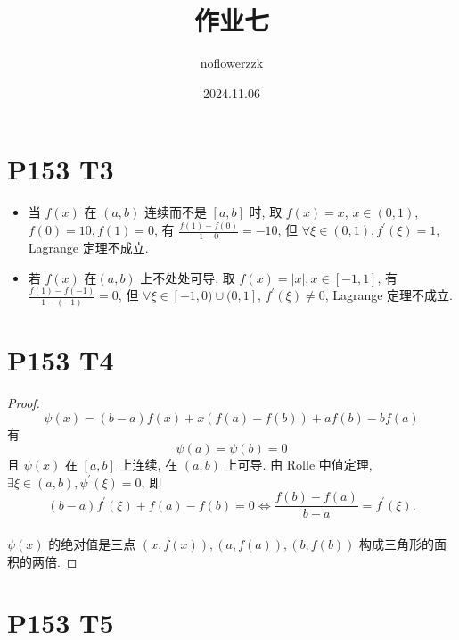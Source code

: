 \documentclass{article}
\title{作业七}
\author{noflowerzzk}
\date{2024.11.06}
\begin{document}
\maketitle

\section*{P153 T3}

\begin{itemize}
    \item 当 $f(x)$ 在 $(a, b)$ 连续而不是 $[a, b]$ 时, 取 $f(x) = x$, $x \in (0, 1)$, $f(0) = 10, f(1) = 0$, 有 $\frac{f(1) - f(0)}{1 - 0} = -10$, 但 $\forall \xi \in (0, 1), f^\prime(\xi) = 1$, Lagrange 定理不成立.
    \item 若 $f(x)$ 在$(a, b)$ 上不处处可导, 取 $f(x) = \left\lvert x\right\rvert , x \in [-1, 1]$, 有 $\frac{f(1) - f(-1)}{1 - (-1)} = 0$, 但 $\forall \xi \in [-1, 0) \cup (0, 1]$, $f^\prime(\xi) \neq 0$, Lagrange 定理不成立.
\end{itemize}

\section*{P153 T4}

\begin{proof}
    \[
        \psi(x) = (b - a)f(x) + x(f(a) - f(b)) + af(b) - bf(a)
    \]
    有
    \[
        \psi(a) = \psi(b) = 0
    \]
    且 $\psi(x)$ 在 $[a, b]$ 上连续, 在 $(a, b)$ 上可导. 由 Rolle 中值定理, $\exists \xi \in (a, b), \psi^\prime(\xi) = 0$, 即
    \[
        (b - a)f^\prime(\xi) + f(a) - f(b) = 0 \Leftrightarrow \frac{f(b) - f(a)}{b - a} = f^\prime(\xi).
    \]
    \qedhere \\
    $\psi(x)$ 的绝对值是三点 $(x, f(x)), (a, f(a)), (b, f(b))$ 构成三角形的面积的两倍.
\end{proof}

\section*{P153 T5}
\end{document}
